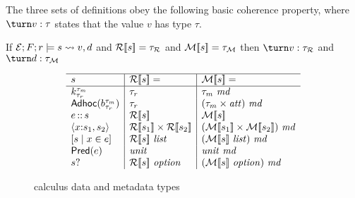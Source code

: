 The three
sets of definitions obey the following basic coherence property, where
$\turn v : \tau$ states that the value $v$ has type $\tau$.

\begin{proposition}
  If $\mathcal{E};F;r \models s \rightsquigarrow v,d$ and ${\cal R}[\![ s ]\!] =
  \tau_{\mathcal{R}}$ and ${\cal M}[\![ s ]\!] = \tau_{\mathcal{M}}$ then $\turn
  v : \tau_{\mathcal{R}}$ and $\turn d : \tau_{\mathcal{M}}$
\end{proposition}


\begin{figure}

\[
\begin{array}{l|l|l}
\hline
s & \repty{s} = & \mdty{s} =  \\
\hline
\Sk & \tau_r &  \tau_m~\mathit{md} \\
\SAdhoc{b} & \tau_r & (\tau_m \times \meta)~\mathit{md} \\
\SPath{e}{s} & \repty{s} & \mdty{s} \\
\SPair{x}{s_1}{s_2} & \repty{s_1} \times \repty{s_2} & \md{\mdty{s_1} \times \mdty{s_2}} \\
\SComp{s}{x}{e} & \repty{s}~\typ{list} & \md{\mdty{s}~\typ{list}}    \\
\SPred{e} & \typ{unit} & \typ{unit}~\mathit{md}\\
\SOption{s} & \repty{s}~\typ{option} & \md{\mdty{s}~\typ{option}} %
\end{array}
\]

%
\caption{\forest{} calculus data and metadata types}
\label{fig:calculus-types}
\end{figure}



